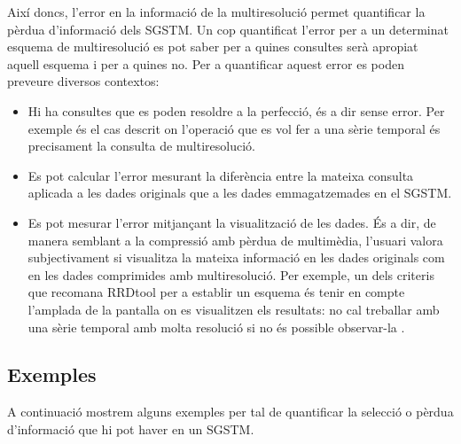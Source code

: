 Així doncs, l'error en la informació de la multiresolució permet
quantificar la pèrdua d'informació dels \gls{SGSTM}. Un cop
quantificat l'error per a un determinat esquema de multiresolució es
pot saber per a quines consultes serà apropiat aquell esquema i per a
quines no. Per a quantificar aquest error es poden preveure diversos
contextos:
\begin{itemize}
\item Hi ha consultes que es poden resoldre a la perfecció, és a dir
  sense error. Per exemple és el cas descrit on l'operació que es vol
  fer a una sèrie temporal és precisament la consulta de
  multiresolució.

\item Es pot calcular l'error mesurant la diferència entre la mateixa
  consulta aplicada a les dades originals que a les dades
  emmagatzemades en el \gls{SGSTM}.

\item Es pot mesurar l'error mitjançant la visualització de les
  dades. És a dir, de manera semblant a la compressió amb pèrdua de
  multimèdia, l'usuari valora subjectivament si visualitza la mateixa
  informació en les dades originals com en les dades comprimides amb
  multiresolució. Per exemple, un dels criteris que recomana RRDtool
  per a establir un esquema és tenir en compte l'amplada de la
  pantalla on es visualitzen els resultats: no cal treballar amb una
  sèrie temporal amb molta resolució si no és possible observar-la
  .

\end{itemize}













\subsection{Exemples}

A continuació mostrem alguns exemples per tal de quantificar la
selecció o pèrdua d'informació que hi pot haver en un \gls{SGSTM}.



